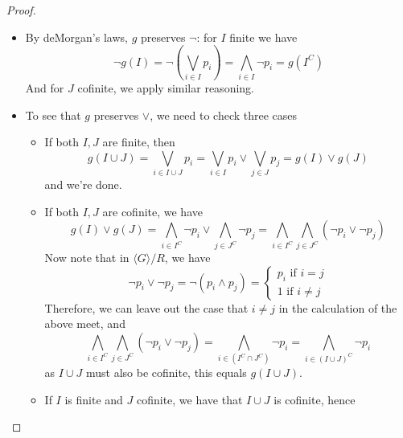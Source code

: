 \begin{proof}
  \begin{itemize}
    \item 
      By deMorgan's laws, $g$ preserves $\neg$:
      for $I$ finite we have
      \begin{equation}
      \neg g(I) = \neg (\bigvee_{i\in I} p_i) = \bigwedge_{i\in I} \neg p_i = g(I^C)
      \end{equation}
      And for $J$ cofinite, we apply similar reasoning. 
    \item To see that $g$ preserves $\vee$, we need to check three cases
      \begin{itemize}
        \item If both $I,J$ are finite, then 
        \begin{equation} 
          g(I \cup J) = \bigvee_{i\in I \cup J} p_i= \bigvee_{i\in I} p_i \vee \bigvee_{j\in J} p_j 
          = g(I) \vee g(J)
        \end{equation}
        and we're done. 
      \item If both $I,J$ are cofinite, we have
        \begin{equation}
          g(I) \vee g(J) = 
          \bigwedge_{i \in I^C} \neg p_i \vee 
          \bigwedge_{j \in J^C} \neg p_j 
          = 
          \bigwedge_{i\in I^C} 
          \bigwedge_{j \in J^C}(\neg p_i \vee  \neg p_j) 
        \end{equation}
        Now note that in $\langle G \rangle / R$, we have 
        \begin{equation}
          \neg p_i \vee \neg p_j = \neg ( p_i \wedge p_j) = 
          \begin{cases}
            p_i \text{ if } i = j\\
            1 \text{ if } i \neq j  
          \end{cases}
        \end{equation}
        Therefore, we can leave out the case that $i\neq j$ in the calculation of the above meet, and
        \begin{equation}
          \bigwedge_{i\in I^C} 
          \bigwedge_{j \in J^C}(\neg p_i \vee  \neg p_j)  
          = 
          \bigwedge_{i \in (I^C \cap J^C)} \neg p_i
          = 
          \bigwedge_{i \in (I \cup J)^C} \neg p_i 
        \end{equation}
        as $I\cup J$ must also be cofinite, this equals 
          $ g( I \cup J)$. 
        \item 
          If $I$ is finite and $J$ cofinite, we have 
          that $I\cup J$ is cofinite, hence 

\end{itemize}
\end{itemize}
\end{proof}
